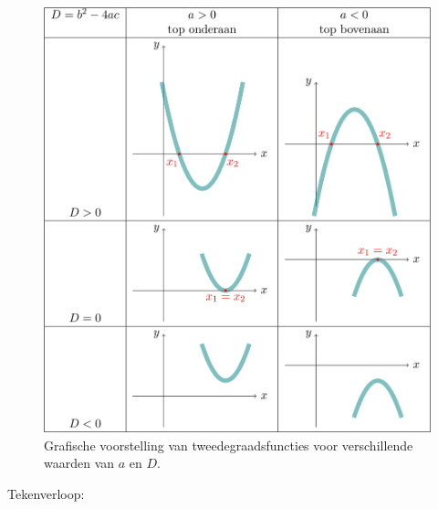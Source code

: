 \



\begin{figure}[h]
\centering 
\includegraphics[scale=0.8]{2_elem_rekenvaardigheden_B/inputs/tweedegraadsfuncties2.jpg} 
\caption{Grafische voorstelling van tweedegraadsfuncties voor verschillende waarden van $a$ en $D$.}
\label{fig:tweede:gevallen}
\end{figure}



Tekenverloop:

